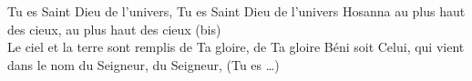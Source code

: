 Tu es Saint Dieu de l’univers, Tu es Saint Dieu de l’univers
Hosanna au plus haut des cieux, au plus haut des cieux (bis)\\
Le ciel et la terre sont remplis de Ta gloire, de Ta gloire Béni soit Celui, qui vient dans le nom du Seigneur, du Seigneur, (Tu es \dots ) 
